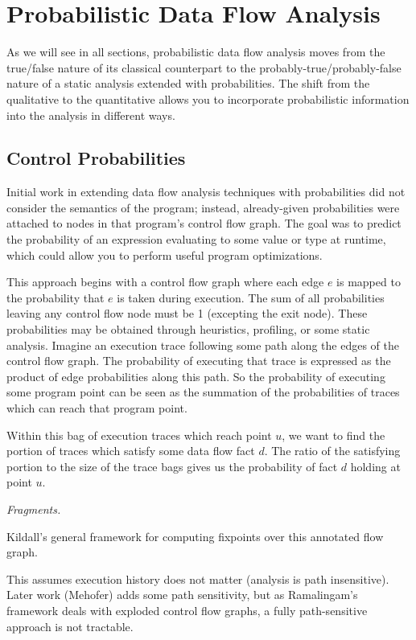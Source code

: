 \section{Probabilistic Data Flow Analysis}
\label{sec:pdfa}

As we will see in all sections, probabilistic data flow
analysis moves from the true/false nature of its classical
counterpart to the probably-true/probably-false nature of
a static analysis extended with probabilities.
The shift from the qualitative to the quantitative allows
you to incorporate probabilistic information into the
analysis in different ways.

\subsection{Control Probabilities}

Initial work in extending data flow analysis 
techniques with probabilities did not consider
the semantics of the program; instead, already-given probabilities 
were attached to nodes in that program's control flow graph.  
The goal was to predict the probability of an expression evaluating 
to some value or type at runtime, which could 
allow you to perform useful program optimizations.

This approach begins with a control flow graph where each edge $e$ is 
mapped to the probability that $e$ is taken during execution.
The sum of all probabilities leaving any control flow node must be 1
(excepting the exit node).
These probabilities may be obtained through heuristics, profiling,
or some static analysis.
Imagine an execution trace following some path along the edges of
the control flow graph.
The probability of executing that trace is expressed as the product of 
edge probabilities along this path.
So the probability of executing some program point can be seen as the
summation of the probabilities of traces which can reach that program
point.


Within this bag of execution traces which reach point $u$, we want to 
find the portion of traces which satisfy some data flow fact $d$.  
The ratio of the satisfying portion to the size of the trace bags
gives us the probability of fact $d$ holding at point $u$.

{\sl 
Fragments. 

Kildall's general framework for computing fixpoints
over this annotated flow graph.

This assumes execution history does not matter (analysis is path 
insensitive).
Later work (Mehofer) adds some path sensitivity, but as Ramalingam's
framework deals with exploded control flow graphs, a fully 
path-sensitive approach is not tractable.
}

